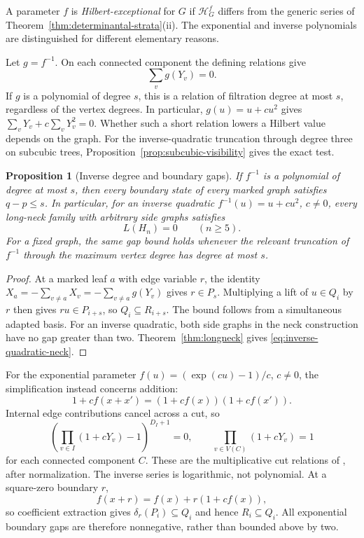 \documentclass[reqno]{article}
\theoremstyle{plain} %
\newtheorem{proposition}[theorem]{Proposition}
\theoremstyle{definition}
\theoremstyle{remark}
\newcommand{\hs}{\mathscr{H}}
\numberwithin{equation}{section}
\begin{document}
A parameter $f$ is \emph{Hilbert-exceptional} for $G$ if $\hs_G^f$
differs from the generic series of
Theorem~\ref{thm:determinantal-strata}(ii). The exponential and inverse
polynomials are distinguished for different elementary reasons.

Let $g=f^{-1}$. On each connected component the defining relations give
\begin{equation}\label{eq:inverse-component-relation}
\sum_vg(Y_v)=0.
\end{equation}
If $g$ is a polynomial of degree $s$, this is a relation of filtration
degree at most $s$, regardless of the vertex degrees. In particular,
$g(u)=u+cu^2$ gives $\sum_vY_v+c\sum_vY_v^2=0$.
Whether such a short relation lowers a Hilbert value depends on the
graph. For the inverse-quadratic
truncation through degree three on subcubic trees,
Proposition~\ref{prop:subcubic-visibility}
gives the exact test.

\begin{proposition}[Inverse degree and boundary gaps]
\label{prop:inverse-degree-gap}
If $f^{-1}$ is a polynomial of degree at most $s$, then every boundary
state of every marked graph satisfies $q-p\le s$.
In particular, for an inverse quadratic $f^{-1}(u)=u+cu^2$, $c\ne0$,
every long-neck family with arbitrary side graphs satisfies
\begin{equation}\label{eq:inverse-quadratic-neck}
L(H_n)=0\qquad(n\ge5).
\end{equation}
For a fixed graph, the same gap bound holds whenever the relevant
truncation of $f^{-1}$ through the maximum vertex degree has degree at most $s$.
\end{proposition}
\begin{proof}
At a marked leaf $a$ with edge variable $r$, the identity
$X_a=-\sum_{v\ne a}X_v=-\sum_{v\ne a}g(Y_v)$ gives $r\in P_s$.
Multiplying a lift of $u\in Q_i$ by $r$ then gives
$ru\in P_{i+s}$, so $Q_i\subseteq R_{i+s}$.
The bound follows from a simultaneous adapted basis.
For an inverse quadratic, both side graphs in the neck construction
have no gap greater than two. Theorem~\ref{thm:longneck} gives
\eqref{eq:inverse-quadratic-neck}.
\end{proof}

For the exponential parameter $f(u)=(\exp(cu)-1)/c$, $c\ne0$, the
simplification instead concerns addition:
\[
1+cf(x+x')=(1+cf(x))(1+cf(x')).
\]
Internal edge contributions cancel across a cut, so
\begin{equation}\label{eq:exponential-cut-relations}
\left(\prod_{v\in I}(1+cY_v)-1\right)^{D_I+1}=0,
\qquad \prod_{v\in V(C)}(1+cY_v)=1
\end{equation}
for each connected component $C$. These are the multiplicative cut
relations of \cite[Theorem~3]{NSh}, after normalization. The inverse
series is logarithmic, not polynomial. At a square-zero boundary $r$,
\[
f(x+r)=f(x)+r(1+cf(x)),
\]
so coefficient extraction gives $\delta_r(P_i)\subseteq Q_i$ and
hence $R_i\subseteq Q_i$. All exponential boundary gaps are therefore
nonnegative, rather than bounded above by two.
\end{document}
